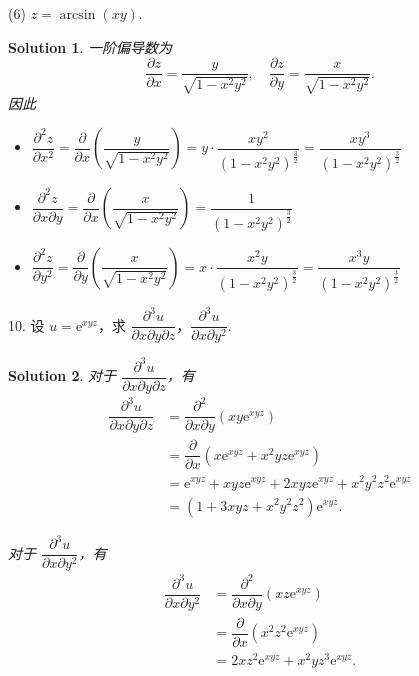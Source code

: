 \documentclass[a4paper,12pt]{article}
\newtheorem*{sol}{Solution}
\begin{document}
(6) $z = \arcsin(xy)$.
\begin{sol}
    一阶偏导数为
    $$
        \frac{\partial z}{\partial x} = \frac{y}{\sqrt{1-x^2y^2}}, \quad \frac{\partial z}{\partial y} = \frac{x}{\sqrt{1-x^2y^2}}.
    $$
    因此
    \begin{itemize}
        \item $\dfrac{\partial^2 z}{\partial x^2} = \dfrac{\partial}{\partial x}\left(\dfrac{y}{\sqrt{1-x^2y^2}}\right) = y \cdot \dfrac{xy^2}{(1-x^2y^2)^{\frac{3}{2}}} = \dfrac{xy^3}{(1-x^2y^2)^{\frac{3}{2}}}$
        \item $\dfrac{\partial^2 z}{\partial x\partial y} = \dfrac{\partial}{\partial x}\left(\dfrac{x}{\sqrt{1-x^2y^2}}\right) = \dfrac{1}{(1-x^2y^2)^{\frac{3}{2}}}$
        \item $\dfrac{\partial^2 z}{\partial y^2} = \dfrac{\partial}{\partial y}\left(\dfrac{x}{\sqrt{1-x^2y^2}}\right) = x \cdot \dfrac{x^2y}{(1-x^2y^2)^{\frac{3}{2}}} = \dfrac{x^3y}{(1-x^2y^2)^{\frac{3}{2}}}$
    \end{itemize}
\end{sol}


10. 设 $u = \mathrm{e}^{xyz}$，求 $\dfrac{\partial^3 u}{\partial x\partial y\partial z}$，$\dfrac{\partial^3 u}{\partial x\partial y^2}$.
\begin{sol}
    对于 $\dfrac{\partial^3 u}{\partial x\partial y\partial z}$，有
    \begin{align*}
        \dfrac{\partial^3 u}{\partial x\partial y\partial z} & = \dfrac{\partial^2}{\partial x\partial y}(xy\mathrm{e}^{xyz})                              \\
                                                             & = \dfrac{\partial}{\partial x}(x\mathrm{e}^{xyz} + x^2yz\mathrm{e}^{xyz})                   \\
                                                             & = \mathrm{e}^{xyz} + xyz\mathrm{e}^{xyz} + 2xyz\mathrm{e}^{xyz} + x^2y^2z^2\mathrm{e}^{xyz} \\
                                                             & = (1 + 3xyz + x^2y^2z^2)\mathrm{e}^{xyz}.
    \end{align*}

    对于 $\dfrac{\partial^3 u}{\partial x\partial y^2}$，有
    \begin{align*}
        \dfrac{\partial^3 u}{\partial x\partial y^2} & = \dfrac{\partial^2}{\partial x\partial y}(xz\mathrm{e}^{xyz}) \\
                                                     & = \dfrac{\partial}{\partial x}(x^2z^2\mathrm{e}^{xyz})         \\
                                                     & = 2xz^2\mathrm{e}^{xyz} + x^2yz^3\mathrm{e}^{xyz}.
    \end{align*}
\end{sol}
\end{document}
